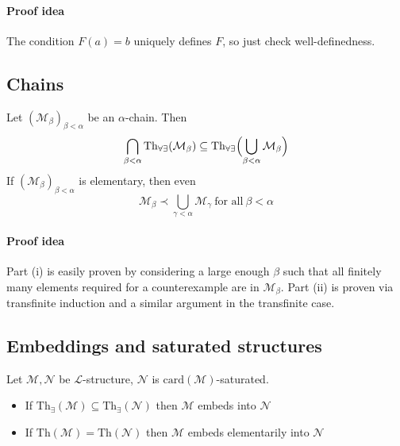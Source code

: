 \documentclass{scrartcl}
\begin{document}
\paragraph{Proof idea} The condition $F(a) = b$ uniquely defines $F$, so just check well-definedness. 

\subsection{Chains}
\label{model_chains_union}
Let $(\mathcal{M}_\beta)_{\beta < \alpha}$ be an $\alpha$-chain. Then
\begin{equation*}
    \bigcap_{\beta < \alpha} \mathrm{Th}_{\forall\exists}(\mathcal{M}_\beta) \subseteq \mathrm{Th}_{\forall\exists}\Bigl( \bigcup_{\beta < \alpha} \mathcal{M}_\beta \Bigr)
\end{equation*}
If $(\mathcal{M}_\beta)_{\beta < \alpha}$ is elementary, then even
\begin{equation*}
    \mathcal{M}_\beta \prec \bigcup_{\gamma < \alpha} \mathcal{M}_\gamma \ \text{for all} \ \beta < \alpha
\end{equation*}
\paragraph{Proof idea} Part (i) is easily proven by considering a large enough $\beta$ such that all finitely many elements required for a counterexample are in $\mathcal{M}_\beta$. 
Part (ii) is proven via transfinite induction and a similar argument in the transfinite case.

\subsection{Embeddings and saturated structures}
\label{saturation_embedding}
Let $\mathcal{M}, \mathcal{N}$ be $\mathcal{L}$-structure, $\mathcal{N}$ is $\mathrm{card}(\mathcal{M})$-saturated.
\begin{itemize}
    \item If $\mathrm{Th}_\exists(\mathcal{M}) \subseteq \mathrm{Th}_\exists(\mathcal{N})$ then $\mathcal{M}$ embeds into $\mathcal{N}$
    \item If $\mathrm{Th}(\mathcal{M}) = \mathrm{Th}(\mathcal{N})$ then $\mathcal{M}$ embeds elementarily into $\mathcal{N}$
\end{itemize}
\end{document}
